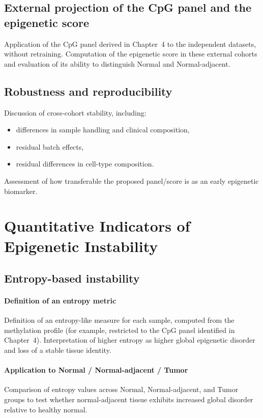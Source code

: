 \documentclass[10pt]{extarticle}
\begin{document}
\subsection{External projection of the CpG panel and the epigenetic score}
Application of the CpG panel derived in Chapter~4 to the independent datasets, without retraining.  
Computation of the epigenetic score in these external cohorts and evaluation of its ability to distinguish Normal and Normal-adjacent.

\subsection{Robustness and reproducibility}
Discussion of cross-cohort stability, including:
\begin{itemize}[label=-]
    \item differences in sample handling and clinical composition,
    \item residual batch effects,
    \item residual differences in cell-type composition.
\end{itemize}
Assessment of how transferable the proposed panel/score is as an early epigenetic biomarker.


\section{Quantitative Indicators of Epigenetic Instability}

\subsection{Entropy-based instability}

\paragraph{Definition of an entropy metric}
Definition of an entropy-like measure for each sample, computed from the methylation profile (for example, restricted to the CpG panel identified in Chapter~4).  
Interpretation of higher entropy as higher global epigenetic disorder and loss of a stable tissue identity.

\paragraph{Application to Normal / Normal-adjacent / Tumor}
Comparison of entropy values across Normal, Normal-adjacent, and Tumor groups to test whether normal-adjacent tissue exhibits increased global disorder relative to healthy normal.
\end{document}

